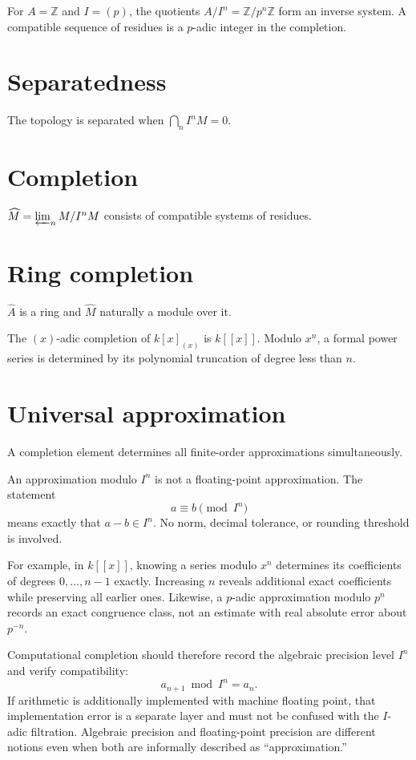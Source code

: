 \begin{example}\label{ex:v18-expand-01}
For $A=\mathbb Z$ and $I=(p)$, the quotients $A/I^n=\mathbb Z/p^n\mathbb Z$ form an inverse system. A compatible sequence of residues is a $p$-adic integer in the completion.
\end{example}
\section{Separatedness}
The topology is separated when $\bigcap_n I^nM=0$.

\section{Completion}
$\widehat M=\varprojlim_n M/I^nM$ consists of compatible systems of residues.

\section{Ring completion}
$\widehat A$ is a ring and $\widehat M$ naturally a module over it.

\begin{example}\label{ex:v18-expand-02}
The $(x)$-adic completion of $k[x]_{(x)}$ is $k[[x]]$. Modulo $x^n$, a formal power series is determined by its polynomial truncation of degree less than $n$.
\end{example}
\section{Universal approximation}
A completion element determines all finite-order approximations simultaneously.

\begin{remark}
An approximation modulo \(I^n\) is not a floating-point approximation.  The
statement
\[
a\equiv b\pmod{I^n}
\]
means exactly that \(a-b\in I^n\).  No norm, decimal tolerance, or rounding
threshold is involved.

For example, in \(k[[x]]\), knowing a series modulo \(x^n\) determines its
coefficients of degrees \(0,\ldots,n-1\) exactly.  Increasing \(n\) reveals
additional exact coefficients while preserving all earlier ones.  Likewise,
a \(p\)-adic approximation modulo \(p^n\) records an exact congruence class,
not an estimate with real absolute error about \(p^{-n}\).

Computational completion should therefore record the algebraic precision
level \(I^n\) and verify compatibility:
\[
a_{n+1}\bmod I^n=a_n.
\]
If arithmetic is additionally implemented with machine floating point, that
implementation error is a separate layer and must not be confused with the
\(I\)-adic filtration.  Algebraic precision and floating-point precision are
different notions even when both are informally described as
``approximation.''
\end{remark}

